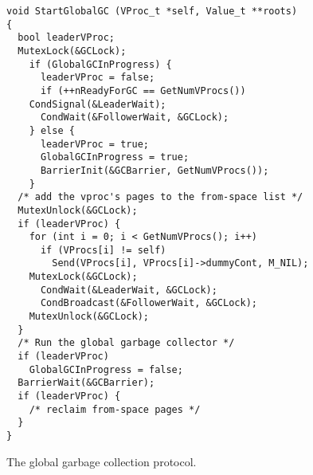 \documentclass[11pt]{article}
\begin{document}
\begin{figure}
\lstset{language=C}
\lstset{commentstyle=\textit}
\lstset{numbers=left}
\begin{lstlisting}
void StartGlobalGC (VProc_t *self, Value_t **roots)
{
  bool leaderVProc;
  MutexLock(&GCLock);
    if (GlobalGCInProgress) {
      leaderVProc = false;
      if (++nReadyForGC == GetNumVProcs())
	CondSignal(&LeaderWait);
      CondWait(&FollowerWait, &GCLock);
    } else {
      leaderVProc = true;
      GlobalGCInProgress = true;
      BarrierInit(&GCBarrier, GetNumVProcs());
    }
  /* add the vproc's pages to the from-space list */
  MutexUnlock(&GCLock);
  if (leaderVProc) {
    for (int i = 0; i < GetNumVProcs(); i++)
      if (VProcs[i] != self)
        Send(VProcs[i], VProcs[i]->dummyCont, M_NIL);
    MutexLock(&GCLock);
      CondWait(&LeaderWait, &GCLock);
      CondBroadcast(&FollowerWait, &GCLock);
    MutexUnlock(&GCLock);    
  }
  /* Run the global garbage collector */
  if (leaderVProc)
    GlobalGCInProgress = false;
  BarrierWait(&GCBarrier);
  if (leaderVProc) {
    /* reclaim from-space pages */
  }
}
\end{lstlisting}
\caption{The global garbage collection protocol.}\label{fig:global-gc-protocol}
\end{figure}
\end{document}
